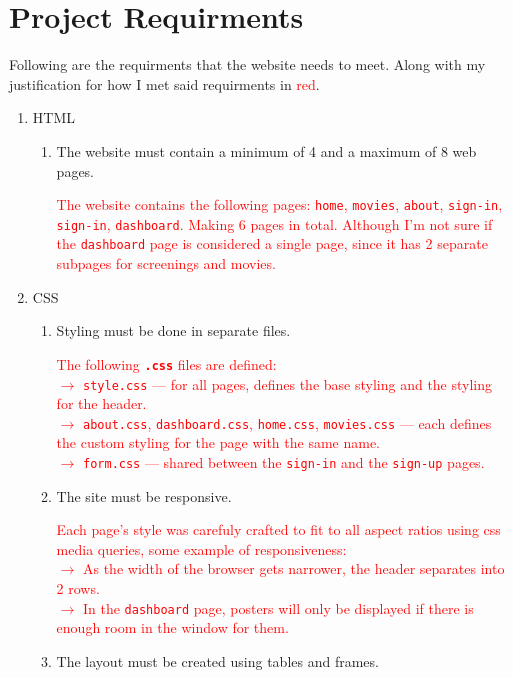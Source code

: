 \documentclass[a4paper]{article}
\begin{document}
\section{Project Requirments}
    Following are the requirments that the website needs to meet. Along with my justification for how I met said requirments in \textcolor{red}{red}.
    \begin{enumerate}
        \item HTML
            \begin{enumerate}[label={$-$}]
            \item The website must contain a minimum of 4 and a maximum of 8 web pages. 
            
            \textcolor{red}{The website contains the following pages: \texttt{home}, \texttt{movies}, \texttt{about}, \texttt{sign-in}, \texttt{sign-in}, \texttt{dashboard}. Making 6 pages in total. Although I'm not sure if the \texttt{dashboard} page is considered a single page, since it has 2 separate subpages for screenings and movies.}
            \end{enumerate}
        \item CSS
            \begin{enumerate}[label={$-$}]
            \item Styling must be done in separate files. 
            
            \textcolor{red}{The following \textbf{\texttt{.css}} files are defined:\\$\rightarrow$ \texttt{style.css} --- for all pages, defines the base styling and the styling for the header.\\$\rightarrow$ \texttt{about.css}, \texttt{dashboard.css}, \texttt{home.css}, \texttt{movies.css} --- each defines the custom styling for the page with the same name.\\$\rightarrow$ \texttt{form.css} --- shared between the \texttt{sign-in} and the \texttt{sign-up} pages.}
            \item The site must be responsive.

            \textcolor{red}{Each page's style was carefuly crafted to fit to all aspect ratios using css media queries, some example of responsiveness:\\$\rightarrow$ As the width of the browser gets narrower, the header separates into 2 rows.\\$\rightarrow$ In the \texttt{dashboard} page, posters will only be displayed if there is enough room in the window for them.}
            \item The layout must be created using tables and frames.
            

\end{enumerate}
\end{enumerate}
\end{document}
